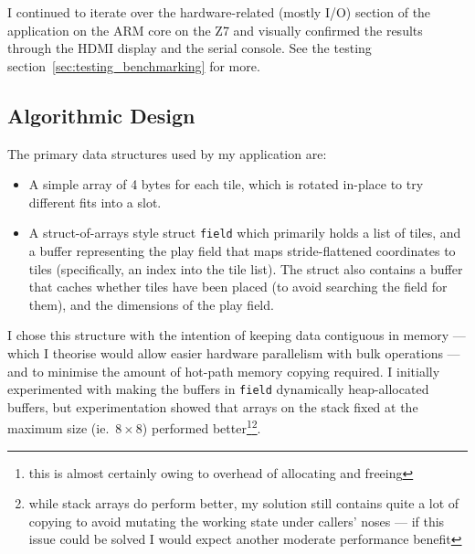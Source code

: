 \documentclass[11pt]{article}
\begin{document}
I continued to iterate over the hardware-related (mostly I/O) section of the application on the ARM core on the Z7 and visually confirmed the results through the HDMI display and the serial console. See the testing section~\ref{sec:testing_benchmarking} for more.

\subsection{Algorithmic Design}


The primary data structures used by my application are:

\begin{itemize}
  \item A simple array of 4 bytes for each tile, which is rotated in-place to try different fits into a slot.
  \item A struct-of-arrays style struct \verb|field| which primarily holds a list of tiles, and a buffer representing the play field that maps stride-flattened coordinates to tiles (specifically, an index into the tile list).
    The struct also contains a buffer that caches whether tiles have been placed (to avoid searching the field for them), and the dimensions of the play field.
\end{itemize}



I chose this structure with the intention of keeping data contiguous in memory --- which I theorise would allow easier hardware parallelism with bulk operations --- and to minimise the amount of hot-path memory copying required.
I initially experimented with making the buffers in \verb|field| dynamically heap-allocated buffers, but experimentation showed that arrays on the stack fixed at the maximum size (ie.\ $8 \times 8$) performed better\footnote{this is almost certainly owing to overhead of allocating and freeing}\footnote{while stack arrays do perform better, my solution still contains quite a lot of copying to avoid mutating the working state under callers' noses --- if this issue could be solved I would expect another moderate performance benefit}.

\end{document}
